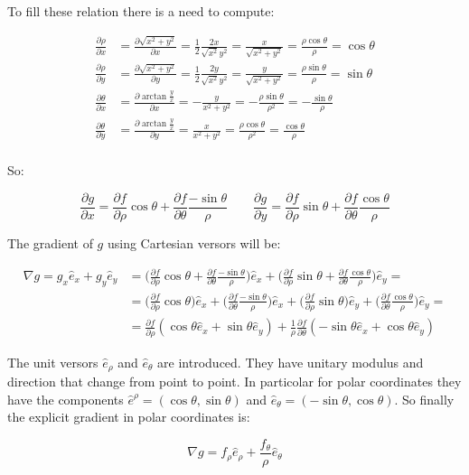 	To fill these relation there is a need to compute:

	\begin{align*}
		\frac{\partial\rho}{\partial x} &= \frac{\partial\sqrt{x^2+y^2}}{\partial x} = \frac{1}{2}\frac{2x}{\sqrt{x^2}{y^2}} = \frac{x}{\sqrt{x^2+y^2}} = \frac{\rho\cos\theta}{\rho} = \cos\theta\\
		\frac{\partial\rho}{\partial y} &= \frac{\partial\sqrt{x^2+y^2}}{\partial y} = \frac{1}{2}\frac{2y}{\sqrt{x^2}{y^2}} = \frac{y}{\sqrt{x^2+y^2}} = \frac{\rho\sin\theta}{\rho} = \sin\theta\\
		\frac{\partial\theta}{\partial x} &= \frac{\partial\arctan\frac{y}{x}}{\partial x} = -\frac{y}{x^2+y^2} = -\frac{\rho\sin\theta}{\rho^2} = -\frac{\sin\theta}{\rho}\\
		\frac{\partial\theta}{\partial y} &= \frac{\partial\arctan\frac{y}{x}}{\partial y} = \frac{x}{x^2+y^2} = \frac{\rho\cos\theta}{\rho^2} = \frac{\cos\theta}{\rho}\\
	\end{align*}

	So:

	$$\frac{\partial g}{\partial x} = \frac{\partial f}{\partial\rho}\cos\theta + \frac{\partial f}{\partial\theta}\frac{-\sin\theta}{\rho}\qquad \frac{\partial g}{\partial y} = \frac{\partial f}{\partial \rho}\sin\theta + \frac{\partial f}{\partial \theta}\frac{\cos\theta}{\rho}$$

	The gradient of $g$ using Cartesian versors will be:

	\begin{align*}
		\nabla g = g_x\hat{e}_x + g_y\hat{e}_y &= \biggl(\frac{\partial f}{\partial\rho}\cos\theta + \frac{\partial f}{\partial \theta}\frac{-\sin\theta}{\rho}\biggr)\hat{e}_x +\biggl(\frac{\partial f}{\partial\rho}\sin\theta + \frac{\partial f}{\partial \theta}\frac{\cos\theta}{\rho}\biggr)\hat{e}_y=\\
																					 &=\biggl(\frac{\partial f}{\partial\rho}\cos\theta\biggr)\hat{e}_x + \biggl(\frac{\partial f}{\partial \theta}\frac{-\sin\theta}{\rho}\biggr)\hat{e}_x +\biggl(\frac{\partial f}{\partial\rho}\sin\theta\biggr)\hat{e}_y + \biggl(\frac{\partial f}{\partial \theta}\frac{\cos\theta}{\rho}\biggr)\hat{e}_y=\\
																					 &=\frac{\partial f}{\partial\rho}(\cos\theta\hat{e}_x + \sin\theta\hat{e}_y) + \frac{1}{\rho}\frac{\partial f}{\partial\theta}(-\sin\theta\hat{e}_x + \cos\theta\hat{e}_y)
	\end{align*}

	The unit versors $\hat{e}_\rho$ and $\hat{e}_\theta$ are introduced.
	They have unitary modulus and direction that change from point to point.
	In particolar for polar coordinates they have the components $\hat{e}^\rho = (\cos\theta, \sin\theta)$ and $\hat{e}_\theta = (-\sin\theta, \cos\theta)$.
	So finally the explicit gradient in polar coordinates is:

	$$\nabla g = f_\rho\hat{e}_\rho + \frac{f_\theta}{\rho}\hat{e}_\theta$$
